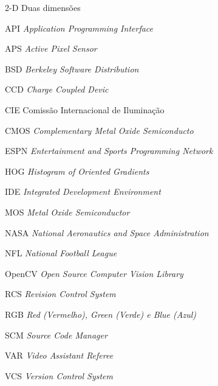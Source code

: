 \begin{siglas}
  \item[2-D] Duas dimensões
  \item[API] \textit{Application Programming Interface}
  \item[APS] \textit{Active Pixel Sensor}
  \item[BSD] \textit{Berkeley Software Distribution}
  \item[CCD] \textit{Charge Coupled Devic}
  \item[CIE] Comissão Internacional de Iluminação
  \item[CMOS] \textit{Complementary Metal Oxide Semiconducto}
  \item[ESPN] \textit{Entertainment and Sports Programming Network}
  \item[HOG] \textit{Histogram of Oriented Gradients}
  \item[IDE] \textit{Integrated Development Environment}
  \item[MOS] \textit{Metal Oxide Semiconductor}
  \item[NASA] \textit{National Aeronautics and Space Administration}
  \item[NFL] \textit{National Football League}
  \item[OpenCV] \textit{Open Source Computer Vision Library}
  \item[RCS] \textit{Revision Control System}
  \item[RGB] \textit{Red (Vermelho), Green (Verde) e Blue (Azul)}
  \item[SCM] \textit{Source Code Manager}
  \item[VAR] \textit{Video Assistant Referee}
  \item[VCS] \textit{Version Control System}
\end{siglas}